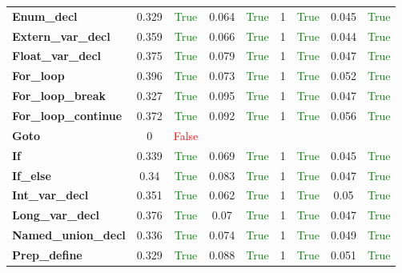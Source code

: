 \documentclass{article}
\begin{document}
\begin{xltabular}{\textwidth}{lcccccccc}
\textbf{{\fontsize{10}{12}\selectfont Enum\_decl}}& 0.329&\textcolor{green}{True}& 0.064&\textcolor{green}{True}& 1&\textcolor{green}{True}& 0.045&\textcolor{green}{True} \\[0.5ex]
\textbf{{\fontsize{10}{12}\selectfont Extern\_var\_decl}}& 0.359&\textcolor{green}{True}& 0.066&\textcolor{green}{True}& 1&\textcolor{green}{True}& 0.044&\textcolor{green}{True} \\[0.5ex]
\textbf{{\fontsize{10}{12}\selectfont Float\_var\_decl}}& 0.375&\textcolor{green}{True}& 0.079&\textcolor{green}{True}& 1&\textcolor{green}{True}& 0.047&\textcolor{green}{True} \\[0.5ex]
\textbf{{\fontsize{10}{12}\selectfont For\_loop}}& 0.396&\textcolor{green}{True}& 0.073&\textcolor{green}{True}& 1&\textcolor{green}{True}& 0.052&\textcolor{green}{True} \\[0.5ex]
\textbf{{\fontsize{10}{12}\selectfont For\_loop\_break}}& 0.327&\textcolor{green}{True}& 0.095&\textcolor{green}{True}& 1&\textcolor{green}{True}& 0.047&\textcolor{green}{True} \\[0.5ex]
\textbf{{\fontsize{10}{12}\selectfont For\_loop\_continue}}& 0.372&\textcolor{green}{True}& 0.092&\textcolor{green}{True}& 1&\textcolor{green}{True}& 0.056&\textcolor{green}{True} \\[0.5ex]
\textbf{{\fontsize{10}{12}\selectfont Goto}}& 0&\textcolor{red}{False} \\[0.5ex]
\textbf{{\fontsize{10}{12}\selectfont If}}& 0.339&\textcolor{green}{True}& 0.069&\textcolor{green}{True}& 1&\textcolor{green}{True}& 0.045&\textcolor{green}{True} \\[0.5ex]
\textbf{{\fontsize{10}{12}\selectfont If\_else}}& 0.34&\textcolor{green}{True}& 0.083&\textcolor{green}{True}& 1&\textcolor{green}{True}& 0.047&\textcolor{green}{True} \\[0.5ex]
\textbf{{\fontsize{10}{12}\selectfont Int\_var\_decl}}& 0.351&\textcolor{green}{True}& 0.062&\textcolor{green}{True}& 1&\textcolor{green}{True}& 0.05&\textcolor{green}{True} \\[0.5ex]
\textbf{{\fontsize{10}{12}\selectfont Long\_var\_decl}}& 0.376&\textcolor{green}{True}& 0.07&\textcolor{green}{True}& 1&\textcolor{green}{True}& 0.047&\textcolor{green}{True} \\[0.5ex]
\textbf{{\fontsize{10}{12}\selectfont Named\_union\_decl}}& 0.336&\textcolor{green}{True}& 0.074&\textcolor{green}{True}& 1&\textcolor{green}{True}& 0.049&\textcolor{green}{True} \\[0.5ex]
\textbf{{\fontsize{10}{12}\selectfont Prep\_define}}& 0.329&\textcolor{green}{True}& 0.088&\textcolor{green}{True}& 1&\textcolor{green}{True}& 0.051&\textcolor{green}{True} \\[0.5ex]

\end{xltabular}
\end{document}
